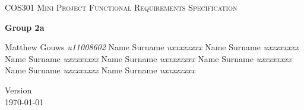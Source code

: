 \begin{titlepage}
\begin{center}

\textsc{\LARGE COS301 Mini Project Functional Requirements Specification}

\textbf{Group 2a} \\
\begin{flushright} \large
Matthew Gouws \emph{u11008602} \newline
Name Surname \emph{uxxxxxxxx} \newline
Name Surname \emph{uxxxxxxxx} \newline
Name Surname \emph{uxxxxxxxx} \newline
Name Surname \emph{uxxxxxxxx} \newline
Name Surname \emph{uxxxxxxxx} \newline
Name Surname \emph{uxxxxxxxx} \newline
Name Surname \emph{uxxxxxxxx} \newline
\end{flushright}

\vfill

{\large Version }
\\
{\large \today}

\end{center}
\end{titlepage}
